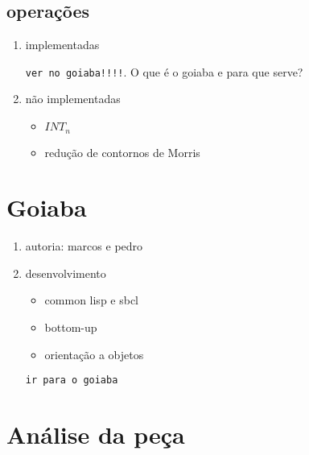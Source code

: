 \documentclass[12pt,a4paper]{article}
\begin{document}
\subsection{operações}

\begin{enumerate}
\item implementadas

  \texttt{ver no goiaba!!!!}. O que é o goiaba e para que serve?
\item não implementadas
  \begin{itemize}
  \item $INT_n$
  \item redução de contornos de Morris
  \end{itemize}
\end{enumerate}

\section{Goiaba}

\begin{enumerate}
\item autoria: marcos e pedro
\item desenvolvimento
  \begin{itemize}
  \item common lisp e sbcl
  \item bottom-up
  \item orientação a objetos
  \end{itemize}
\texttt{ir para o goiaba}
\end{enumerate}

\section{Análise da peça}
\end{document}
